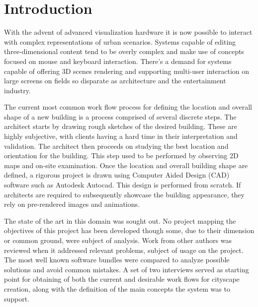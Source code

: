 \chapter{Introduction}





With the advent of advanced visualization hardware it is now possible
to interact with complex representations of urban scenarios.
Systems capable of editing three-dimensional content
tend to be overly complex and make use of concepts
focused on mouse and keyboard interaction.
There's a demand for systems capable of offering 3D scenes rendering
and supporting multi-user interaction on large screens on fields
so disparate as architecture and the entertainment industry.

The current most common work flow process for defining the location and overall shape
of a new building is a process comprised of several discrete steps.
The architect starts by drawing rough sketches of the desired building.
These are highly subjective, with clients having a hard time in their interpretation and validation.
The architect then proceeds on studying the best location and orientation for the building.
This step used to be performed by observing 2D maps and on-site examination.
Once the location and overall building shape are defined, a rigorous project is drawn using
Computer Aided Design (CAD) software such as Autodesk Autocad\cite{SITE-AUTOCAD}.
This design is performed from scratch.
If architects are required to subsequently showcase the building appearance,
they rely on pre-rendered images and animations.



The state of the art in this domain was sought out. No project mapping the objectives of this project
has been developed though some, due to their dimension or common ground, were subject of analysis.
Work from other authors was reviewed when it addressed relevant problems, subject of usage on the project.
The most well known software bundles were compared to analyze possible solutions and avoid common mistakes.
A set of two interviews served as starting point for obtaining of both the current and desirable work flows
for cityscape creation, along with the definition of the main concepts the system was to support.


